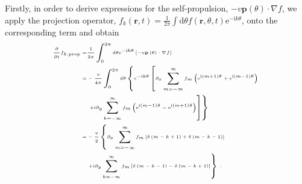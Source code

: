 \documentclass[a4paper, amsfonts, amssymb, amsmath, reprint, showkeys, showpacs, nofootinbib, twoside]{revtex4-2}
\begin{document}
Firstly, in order to derive expressions for the self-propulsion, $-v\mathbf{p}\left( \theta \right) \cdot \nabla f$, we apply the projection operator, $f _{k}\left( \mathbf{r},t \right) =\frac{1}{2\pi}\int{\mathrm{d}\theta f \left( \mathbf{r},\theta ,t \right) \mathrm{e}^{-\mathrm{i}k\theta}}$, onto the corresponding term and obtain
\begin{equation}
    \tiny
    \begin{aligned}
        \frac{\partial}{\partial t}f_{k,\mathrm{prop}}=&\frac{1}{2\pi}\int_0^{2\pi}{\mathrm{d}\theta \mathrm{e}^{-\mathrm{i}k\theta}\left[ -v\mathbf{p}\left( \theta \right) \cdot \nabla f \right]}\\
        =&-\frac{v}{4\pi}\int_0^{2\pi}{\mathrm{d}\theta \left\{ \mathrm{e}^{-\mathrm{i}k\theta}\left[ \partial _x\sum_{m=-\infty}^{\infty}{f_m\left( \mathrm{e}^{\mathrm{i}\left( m+1 \right) \theta}+\mathrm{e}^{\mathrm{i}\left( m-1 \right) \theta} \right)} \right. \right.}\\
        &\left. \left. +\mathrm{i}\partial _y\sum_{k=-\infty}^{\infty}{f_m\left( \mathrm{e}^{\mathrm{i}\left( m-1 \right) \theta}-\mathrm{e}^{\mathrm{i}\left( m+1 \right) \theta} \right)} \right] \right\}\\
        =&-\frac{v}{2}\left\{ \partial _x\sum_{m=-\infty}^{\infty}{f_m\left[ \delta \left( m-k+1 \right) +\delta \left( m-k-1 \right) \right]} \right.\\
        &\left. +\mathrm{i}\partial _y\sum_{k=-\infty}^{\infty}{f_m\left[ \delta \left( m-k-1 \right) -\delta \left( m-k+1 \right) \right]} \right\} \;.\\
    \end{aligned}
\end{equation}
\end{document}
